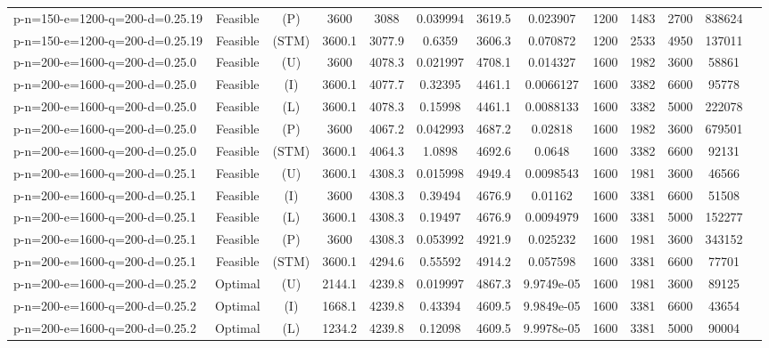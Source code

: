\documentclass[landscape, a4paper]{article}
\newcommand{\STM}{\ensuremath{\mathrm{STM}}}
\newcommand{\Improved}{\ensuremath{\mathrm{I}}}
\newcommand{\Loose}{\ensuremath{\mathrm{L}}}
\newcommand{\Profit}{\ensuremath{\mathrm{P}}}
\newcommand{\Utility}{\ensuremath{\mathrm{U}}}
\begin{document}
\begin{center}
\begin{tabular}{lcccccccccccc}
p-n=150-e=1200-q=200-d=0.25.19 & Feasible & (\Profit) & 3600 & 3088 & 0.039994 & 3619.5 & 0.023907 & 1200 & 1483 & 2700 & 838624 & \\
p-n=150-e=1200-q=200-d=0.25.19 & Feasible & (\STM) & 3600.1 & 3077.9 & 0.6359 & 3606.3 & 0.070872 & 1200 & 2533 & 4950 & 137011 & \\
p-n=200-e=1600-q=200-d=0.25.0 & Feasible & (\Utility) & 3600 & 4078.3 & 0.021997 & 4708.1 & 0.014327 & 1600 & 1982 & 3600 & 58861 & \\
p-n=200-e=1600-q=200-d=0.25.0 & Feasible & (\Improved) & 3600.1 & 4077.7 & 0.32395 & 4461.1 & 0.0066127 & 1600 & 3382 & 6600 & 95778 & \\
p-n=200-e=1600-q=200-d=0.25.0 & Feasible & (\Loose) & 3600.1 & 4078.3 & 0.15998 & 4461.1 & 0.0088133 & 1600 & 3382 & 5000 & 222078 & \\
p-n=200-e=1600-q=200-d=0.25.0 & Feasible & (\Profit) & 3600 & 4067.2 & 0.042993 & 4687.2 & 0.02818 & 1600 & 1982 & 3600 & 679501 & \\
p-n=200-e=1600-q=200-d=0.25.0 & Feasible & (\STM) & 3600.1 & 4064.3 & 1.0898 & 4692.6 & 0.0648 & 1600 & 3382 & 6600 & 92131 & \\
p-n=200-e=1600-q=200-d=0.25.1 & Feasible & (\Utility) & 3600.1 & 4308.3 & 0.015998 & 4949.4 & 0.0098543 & 1600 & 1981 & 3600 & 46566 & \\
p-n=200-e=1600-q=200-d=0.25.1 & Feasible & (\Improved) & 3600 & 4308.3 & 0.39494 & 4676.9 & 0.01162 & 1600 & 3381 & 6600 & 51508 & \\
p-n=200-e=1600-q=200-d=0.25.1 & Feasible & (\Loose) & 3600.1 & 4308.3 & 0.19497 & 4676.9 & 0.0094979 & 1600 & 3381 & 5000 & 152277 & \\
p-n=200-e=1600-q=200-d=0.25.1 & Feasible & (\Profit) & 3600 & 4308.3 & 0.053992 & 4921.9 & 0.025232 & 1600 & 1981 & 3600 & 343152 & \\
p-n=200-e=1600-q=200-d=0.25.1 & Feasible & (\STM) & 3600.1 & 4294.6 & 0.55592 & 4914.2 & 0.057598 & 1600 & 3381 & 6600 & 77701 & \\
p-n=200-e=1600-q=200-d=0.25.2 & Optimal & (\Utility) & 2144.1 & 4239.8 & 0.019997 & 4867.3 & 9.9749e-05 & 1600 & 1981 & 3600 & 89125 & \\
p-n=200-e=1600-q=200-d=0.25.2 & Optimal & (\Improved) & 1668.1 & 4239.8 & 0.43394 & 4609.5 & 9.9849e-05 & 1600 & 3381 & 6600 & 43654 & \\
p-n=200-e=1600-q=200-d=0.25.2 & Optimal & (\Loose) & 1234.2 & 4239.8 & 0.12098 & 4609.5 & 9.9978e-05 & 1600 & 3381 & 5000 & 90004 & \\

\end{tabular}
\end{center}
\end{document}
